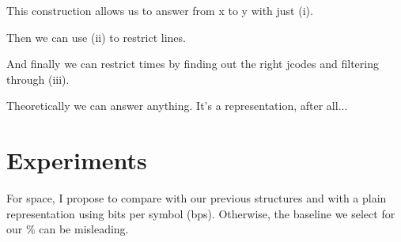 \documentclass[runningheads]{llncs}
\newcommand{\ctr}{NewCTR (name subject to change)\ }
\begin{document}
This construction allows us to answer from x to y with just (i).

Then we can use (ii) to restrict lines.

And finally we can restrict times by finding out the right jcodes and filtering through (iii).

Theoretically we can answer anything. It's a representation, after all...

\begin{algorithm}[H]
 
 
 \caption{Querying for all features on \ctr where ,  and  are structures (i), (ii) and (iii), respectively}
\end{algorithm}


\section{Experiments}
For space, I propose to compare with our previous structures and with a plain representation using bits per symbol (bps). Otherwise, the baseline we select for our $\%$ can be misleading.
\end{document}
